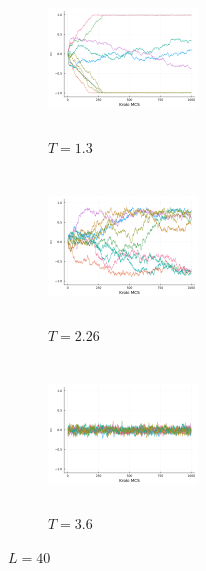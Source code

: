 \documentclass[12pt]{article}
\begin{document}
\begin{figure}[H]
  \centering

  \begin{subfigure}[b]{0.3\linewidth}
    \centering
    \includegraphics[width=150px, height=150px]{../data/magnetizations/40_T1.3.png}
    \caption{$T=1.3$}
    \label{fig:image1}
  \end{subfigure}
  \hfill
  \begin{subfigure}[b]{0.3\linewidth}
    \centering
    \includegraphics[width=150px, height=150px]{../data/magnetizations/40_T2.26.png}
    \caption{$T=2.26$}
    \label{fig:image2}
  \end{subfigure}
  \hfill
  \begin{subfigure}[b]{0.3\linewidth}
    \centering
    \includegraphics[width=150px, height=150px]{../data/magnetizations/40_T3.6.png}
    \caption{$T=3.6$}
    \label{fig:image3}
  \end{subfigure}

  \caption{$L=40$}
  \label{fig:series}
\end{figure}
\end{document}
